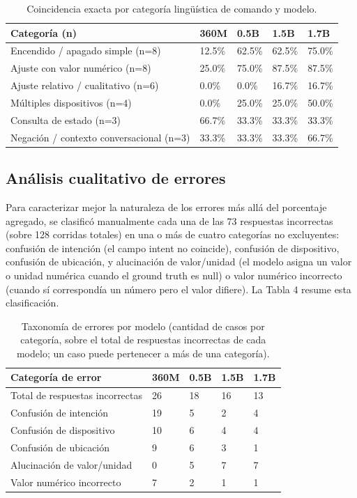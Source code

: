 \begin{table}[htbp]
\centering
\caption{Coincidencia exacta por categoría lingüística de comando y modelo.}
\label{tab:orig-categorias}
\begin{tabular}{lllll}
\toprule
Categoría (n) & 360M & 0.5B & 1.5B & 1.7B \\
\midrule
Encendido / apagado simple (n=8)           & 12.5\% & 62.5\% & 62.5\% & 75.0\% \\
Ajuste con valor numérico (n=8)            & 25.0\% & 75.0\% & 87.5\% & 87.5\% \\
Ajuste relativo / cualitativo (n=6)        & 0.0\%  & 0.0\%  & 16.7\% & 16.7\% \\
Múltiples dispositivos (n=4)               & 0.0\%  & 25.0\% & 25.0\% & 50.0\% \\
Consulta de estado (n=3)                   & 66.7\% & 33.3\% & 33.3\% & 33.3\% \\
Negación / contexto conversacional (n=3)   & 33.3\% & 33.3\% & 33.3\% & 66.7\% \\
\bottomrule
\end{tabular}
\end{table}

\subsection{Análisis cualitativo de errores}

Para caracterizar mejor la naturaleza de los errores más allá del
porcentaje agregado, se clasificó manualmente cada una de las 73 respuestas
incorrectas (sobre 128 corridas totales) en una o más de cuatro categorías
no excluyentes: confusión de intención (el campo intent no coincide),
confusión de dispositivo, confusión de ubicación, y alucinación de
valor/unidad (el modelo asigna un valor o unidad numérica cuando el ground
truth es null) o valor numérico incorrecto (cuando sí correspondía un
número pero el valor difiere). La Tabla 4 resume esta clasificación.

\begin{table}[htbp]
\centering
\caption{Taxonomía de errores por modelo (cantidad de casos por categoría,
sobre el total de respuestas incorrectas de cada modelo; un caso puede
pertenecer a más de una categoría).}
\label{tab:orig-taxonomia}
\begin{tabular}{lllll}
\toprule
Categoría de error & 360M & 0.5B & 1.5B & 1.7B \\
\midrule
Total de respuestas incorrectas & 26 & 18 & 16 & 13 \\
Confusión de intención          & 19 & 5  & 2  & 4  \\
Confusión de dispositivo        & 10 & 6  & 4  & 4  \\
Confusión de ubicación          & 9  & 6  & 3  & 1  \\
Alucinación de valor/unidad     & 0  & 5  & 7  & 7  \\
Valor numérico incorrecto       & 7  & 2  & 1  & 1  \\
\bottomrule
\end{tabular}
\end{table}

